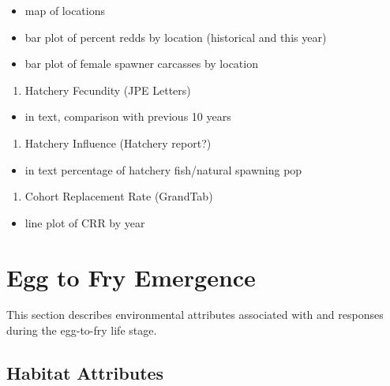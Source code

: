 \documentclass[
]{book}
\providecommand{\tightlist}{%
  \setlength{\itemsep}{0pt}\setlength{\parskip}{0pt}}
\theoremstyle{definition}
\theoremstyle{definition}
\theoremstyle{definition}
\theoremstyle{definition}
\theoremstyle{remark}
\begin{document}
\begin{itemize}
\tightlist
\item
  map of locations
\item
  bar plot of percent redds by location (historical and this year)
\item
  bar plot of female spawner carcasses by location
\end{itemize}

\begin{enumerate}
\def\labelenumi{\arabic{enumi}.}
\setcounter{enumi}{7}
\tightlist
\item
  Hatchery Fecundity (JPE Letters)
\end{enumerate}

\begin{itemize}
\tightlist
\item
  in text, comparison with previous 10 years
\end{itemize}

\begin{enumerate}
\def\labelenumi{\arabic{enumi}.}
\setcounter{enumi}{8}
\tightlist
\item
  Hatchery Influence (Hatchery report?)
\end{enumerate}

\begin{itemize}
\tightlist
\item
  in text percentage of hatchery fish/natural spawning pop
\end{itemize}

\begin{enumerate}
\def\labelenumi{\arabic{enumi}.}
\setcounter{enumi}{9}
\tightlist
\item
  Cohort Replacement Rate (GrandTab)
\end{enumerate}

\begin{itemize}
\tightlist
\item
  line plot of CRR by year
\end{itemize}

\hypertarget{egg-to-fry-emergence}{%
\chapter{Egg to Fry Emergence}\label{egg-to-fry-emergence}}

This section describes environmental attributes associated with and responses during the egg-to-fry life stage.

\hypertarget{habitat-attributes-1}{%
\section{Habitat Attributes}\label{habitat-attributes-1}}
\end{document}
